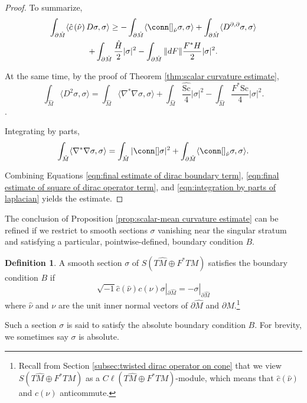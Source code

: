 \documentclass[12pt, reqno]{amsart}
\theoremstyle{plain} %
\theoremstyle{definition}
\newtheorem{definition}[theorem]{Definition}
\theoremstyle{remark}
\numberwithin{equation}{section}
\newcommand{\dom}[1]{\hat{#1}}
\newcommand{\onorm}[1]{\Vert #1 \Vert}
\newcommand{\pnorm}[1]{| #1 |}
\newcommand{\bnd}[1]{\partial #1}
\newcommand{\cbar}[1]{\dom{c}\left(#1\right)}
\newcommand{\Sc}{\mathrm{Sc}}
\newcommand{\inner}[1]{\langle #1 \rangle}
\newcommand{\Cl}{C\ell}
\begin{document}
\begin{proof}
    To summarize,
    \begin{multline}\label{eqn:final estimate of dirac boundary term}
        \int_{\bnd{\dom{M}}} \inner{\cbar{\dom{\nu}} D \sigma, \sigma} \geq -\int_{\bnd{\dom{M}}} \inner{\conn[]_{\dom{\nu}} \sigma, \sigma} + \int_{\bnd{\dom{M}}} \inner{D^{\partial, \partial}\sigma, \sigma}\\
        + \int_{\bnd{\dom{M}}} \frac{\dom{H}}{2} \pnorm{\sigma}^2 - \int_{\bnd{\dom{M}}} \onorm{dF} \frac{F^*H}{2} \pnorm{\sigma}^2.
    \end{multline}

    At the same time, by the proof of Theorem \ref{thm:scalar curvature estimate},
    \begin{equation}\label{eqn:final estimate of square of dirac operator term}
        \int_{\dom{M}} \inner{D^2 \sigma, \sigma} = \int_{\dom{M}} \inner{\nabla^*\nabla \sigma, \sigma} + \int_{\dom{M}} \frac{\dom{\Sc}}{4} \pnorm{\sigma}^2 - \int_{\dom{M}} \frac{F^*\Sc}{4} \pnorm{\sigma}^2.
    \end{equation}.

    Integrating by parts,
    \begin{equation}\label{eqn:integration by parts of laplacian}
        \int_{\dom{M}} \inner{\nabla^*\nabla \sigma, \sigma} = \int_{\dom{M}} \pnorm{\conn[] \sigma}^2 + \int_{\bnd{\dom{M}}} \inner{\conn[]_{\dom{\nu}} \sigma, \sigma}.
    \end{equation}

    Combining Equations \eqref{eqn:final estimate of dirac boundary term}, \eqref{eqn:final estimate of square of dirac operator term}, and \eqref{eqn:integration by parts of laplacian} yields the estimate.
\end{proof}

The conclusion of Proposition \ref{prop:scalar-mean curvature estimate} can be refined if we restrict to smooth sections \(\sigma\) vanishing near the singular stratum and satisfying a particular, pointwise-defined, boundary condition \(B\).
\begin{definition}
    A smooth section \(\sigma\) of \(S(T\dom{M} \oplus F^*TM)\) satisfies the boundary condition \(B\) if
    \begin{equation*}
        \sqrt{-1}\cbar{\dom{\nu}} c(\nu) \sigma|_{\bnd{\dom{M}}} = -\sigma|_{\bnd{\dom{M}}}
    \end{equation*}
    where \(\dom{\nu}\) and \(\nu\) are the unit inner normal vectors of \(\bnd{\dom{M}}\) and \(\bnd{M}\).\footnote{Recall from Section \ref{subsec:twisted dirac operator on cone} that we view \(S(T\dom{M} \oplus F^*TM)\) as a \(\Cl(T\dom{M} \oplus F^*TM)\)-module, which means that \(\dom{c}(\dom{\nu})\) and \(c(\nu)\) anticommute.}

    Such a section \(\sigma\) is said to satisfy the absolute boundary condition \(B\).
    For brevity, we sometimes say \(\sigma\) is absolute.
\end{definition}
\end{document}
